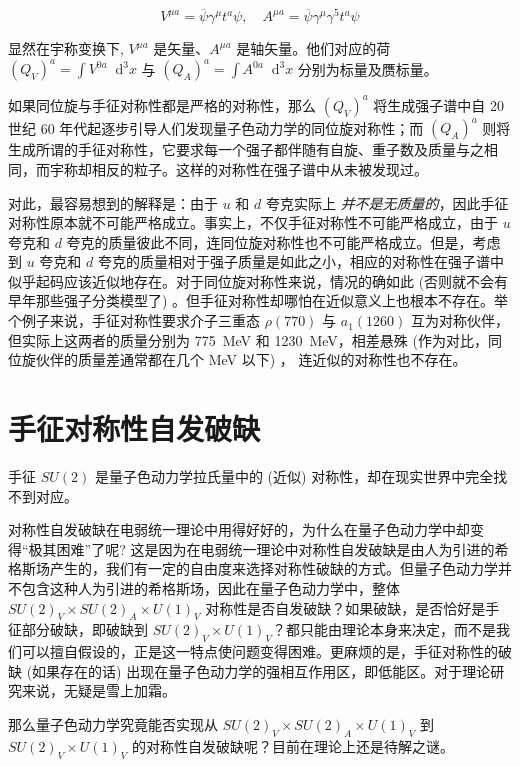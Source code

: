 \documentclass[oneside,a4paper,openany,11pt]{ctexbook}
\newcommand*{\dif}{\mathop{}\!\mathrm{d}} %
\begin{document}
\begin{equation}
    V^{\mu a} = \overline{\psi} \gamma^\mu t^a \psi, \quad A^{\mu a} = \overline{\psi} \gamma^\mu \gamma^5 t^a \psi
\end{equation}

\noindent 显然在宇称变换下, $V^{\mu a}$ 是矢量、$A^{\mu a}$ 是轴矢量。他们对应的荷 $(Q_V)^a=\int V^{0a} \dif^3 x$ 与 $(Q_A)^a=\int A^{0a} \dif^3 x$ 分别为标量及赝标量。

如果同位旋与手征对称性都是严格的对称性，那么 $(Q_V)^a$ 将生成强子谱中自 20 世纪 60 年代起逐步引导人们发现量子色动力学的同位旋对称性；而 $(Q_A)^a$ 则将生成所谓的手征对称性，它要求每一个强子都伴随有自旋、重子数及质量与之相同，而宇称却相反的粒子。这样的对称性在强子谱中从未被发现过。

对此，最容易想到的解释是：由于 $u$ 和 $d$ 夸克实际上 \emph{并不是无质量的}，因此手征对称性原本就不可能严格成立。事实上，不仅手征对称性不可能严格成立，由于 $u$ 夸克和 $d$ 夸克的质量彼此不同，连同位旋对称性也不可能严格成立。但是，考虑到 $u$ 夸克和 $d$ 夸克的质量相对于强子质量是如此之小，相应的对称性在强子谱中似乎起码应该近似地存在。对于同位旋对称性来说，情况的确如此 (否则就不会有早年那些强子分类模型了) 。但手征对称性却哪怕在近似意义上也根本不存在。举个例子来说，手征对称性要求介子三重态 $\rho(770)$ 与 $a_1(1260)$ 互为对称伙伴，但实际上这两者的质量分别为 \qty{775}{MeV} 和 \qty{1230}{MeV}，相差悬殊 (作为对比，同位旋伙伴的质量差通常都在几个 \unit{MeV} 以下) ， 连近似的对称性也不存在。

\section{手征对称性自发破缺}

手征 $SU(2)$ 是量子色动力学拉氏量中的 (近似) 对称性，却在现实世界中完全找不到对应。

对称性自发破缺在电弱统一理论中用得好好的，为什么在量子色动力学中却变得“极其困难”了呢? 这是因为在电弱统一理论中对称性自发破缺是由人为引进的希格斯场产生的，我们有一定的自由度来选择对称性破缺的方式。但量子色动力学并不包含这种人为引进的希格斯场，因此在量子色动力学中，整体 $SU(2)_V \times SU(2)_A \times U(1)_V$ 对称性是否自发破缺？如果破缺，是否恰好是手征部分破缺，即破缺到 $SU(2)_V \times U(1)_V$？都只能由理论本身来决定，而不是我们可以擅自假设的，正是这一特点使问题变得困难。更麻烦的是，手征对称性的破缺 (如果存在的话) 出现在量子色动力学的强相互作用区，即低能区。对于理论研究来说，无疑是雪上加霜。

那么量子色动力学究竟能否实现从 $SU(2)_V \times SU(2)_A \times U(1)_V$ 到 $SU(2)_V \times U(1)_V$ 的对称性自发破缺呢？目前在理论上还是待解之谜。
\end{document}
